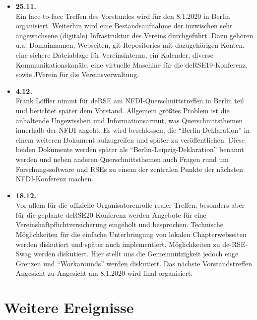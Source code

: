 \begin{itemize}
 \item \textbf{25.11.}\\
 Ein face-to-face Treffen des Vorstandes wird für den 8.1.2020 in Berlin organisiert. Weiterhin wird eine Bestandsaufnahme der inzwischen sehr angewachsene (digitale) Infrastruktur des Vereins durchgeführt. Dazu gehören u.a. Domainnamen, Webseiten, git-Repositories mit dazugehörigen Konten, eine sichere Dateiablage für Vereinsinterna, ein Kalender, diverse Kommunikationskanäle, eine virtuelle Maschine für die deRSE19-Konferenz, sowie JVerein für die Vereinsverwaltung.
\clearpage
 \item \textbf{4.12.}\\
 Frank Löffler nimmt für deRSE am NFDI-Querschnittstreffen in Berlin teil und berichtet später dem Vorstand. Allgemein größtes Problem ist die anhaltende Ungewissheit und Informationsarmut, was Querschnittsthemen innerhalb der NFDI angeht. Es wird beschlossen, die "`Berlin-Deklaration"' in einem weiteren Dokument aufzugreifen und später zu veröffentlichen. Diese beiden Dokumente werden später als "`Berlin-Leipzig-Deklaration"' benannt werden und neben anderen Querschnittsthemen auch Fragen rund um Forschungssoftware und RSEs zu einem der zentralen Punkte der nächsten NFDI-Konferenz machen.

 \item \textbf{18.12.}\\
 Vor allem für die offizielle Organisatorenrolle realer Treffen, besonders aber für die geplante deRSE20 Konferenz werden Angebote für eine Vereinshaftpflichtversicherung eingeholt und besprochen. Technische Möglichkeiten für die einfache Unterbringung von lokalen Chapterwebseiten werden diskutiert und später auch implementiert. Möglichkeiten zu de-RSE-Swag werden diskutiert. Hier stellt uns die Gemeinnützigkeit jedoch enge Grenzen und "`Workarounds"' werden diskutiert. Das nächste Vorstandstreffen Angesicht-zu-Angesicht am 8.1.2020 wird final organisiert.

\end{itemize}
\section{Weitere Ereignisse}

